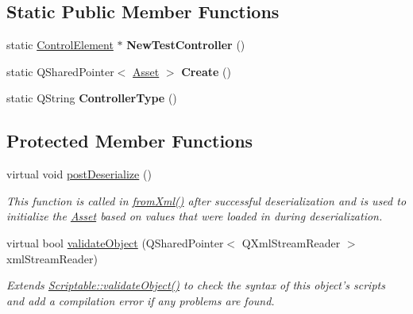 \subsection*{Static Public Member Functions}
\begin{DoxyCompactItemize}
\item 
\hypertarget{class_picto_1_1_test_controller_af5f8e0966ffb5f809b13f242076d7559}{static \hyperlink{class_picto_1_1_control_element}{Control\-Element} $\ast$ {\bfseries New\-Test\-Controller} ()}\label{class_picto_1_1_test_controller_af5f8e0966ffb5f809b13f242076d7559}

\item 
\hypertarget{class_picto_1_1_test_controller_a3453205023b16f0dd9649ef45e60bbab}{static Q\-Shared\-Pointer$<$ \hyperlink{class_picto_1_1_asset}{Asset} $>$ {\bfseries Create} ()}\label{class_picto_1_1_test_controller_a3453205023b16f0dd9649ef45e60bbab}

\item 
\hypertarget{class_picto_1_1_test_controller_a3b2c4bd9a8db4e408844ae0c733056b3}{static Q\-String {\bfseries Controller\-Type} ()}\label{class_picto_1_1_test_controller_a3b2c4bd9a8db4e408844ae0c733056b3}

\end{DoxyCompactItemize}
\subsection*{Protected Member Functions}
\begin{DoxyCompactItemize}
\item 
virtual void \hyperlink{class_picto_1_1_test_controller_a5912c981db3d499dbf41e50faec2648d}{post\-Deserialize} ()
\begin{DoxyCompactList}\small\item\em This function is called in \hyperlink{class_picto_1_1_asset_a8bed4da09ecb1c07ce0dab313a9aba67}{from\-Xml()} after successful deserialization and is used to initialize the \hyperlink{class_picto_1_1_asset}{Asset} based on values that were loaded in during deserialization. \end{DoxyCompactList}\item 
\hypertarget{class_picto_1_1_test_controller_aaba0fa543d3dd1f83b60b414226efac1}{virtual bool \hyperlink{class_picto_1_1_test_controller_aaba0fa543d3dd1f83b60b414226efac1}{validate\-Object} (Q\-Shared\-Pointer$<$ Q\-Xml\-Stream\-Reader $>$ xml\-Stream\-Reader)}\label{class_picto_1_1_test_controller_aaba0fa543d3dd1f83b60b414226efac1}

\begin{DoxyCompactList}\small\item\em Extends \hyperlink{class_picto_1_1_scriptable_ab6e2944c43a3b5d418bf7b251594386d}{Scriptable\-::validate\-Object()} to check the syntax of this object's scripts and add a compilation error if any problems are found. \end{DoxyCompactList}\end{DoxyCompactItemize}
